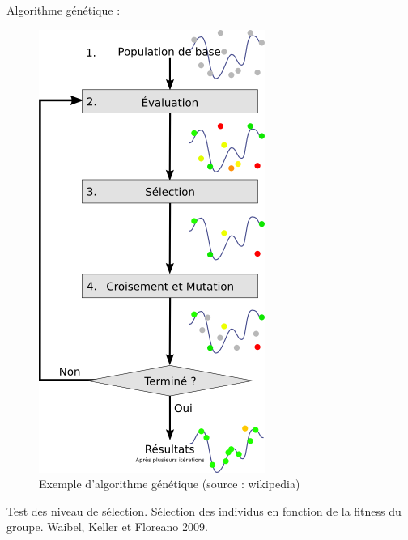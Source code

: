 \documentclass[8pt]{beamer}
\begin{document}
\begin{frame}
	Algorithme génétique :
	\begin{figure}
		\centering
		\includegraphics[width=.3\textwidth]{images/AG.png}
		\caption{Exemple d'algorithme génétique (source : wikipedia)}\label{fig:AG}
	\end{figure}
\end{frame}

\begin{frame}
	Test des  niveau de sélection. 
	Sélection des individus en fonction de la fitness du groupe.
	Waibel, Keller et Floreano 2009.
\end{frame}

\begin{frame}
	
	
\end{frame}
\end{document}
